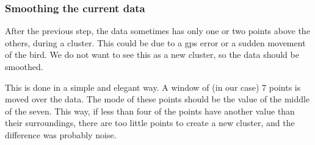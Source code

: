 \subsubsection{Smoothing the current data}
After the previous step, the data sometimes has only one or two points above the
others, during a cluster. This could be due to a gps error or a sudden movement
of the bird. We do not want to see this as a new cluster, so the data should be
smoothed.

This is done in a simple and elegant way. A window of (in our case) 7 points is
moved over the data. The mode of these points should be the value of the middle
of the seven. This way, if less than four of the points have another value than
their surroundings, there are too little points to create a new cluster, and the
difference was probably noise. 
